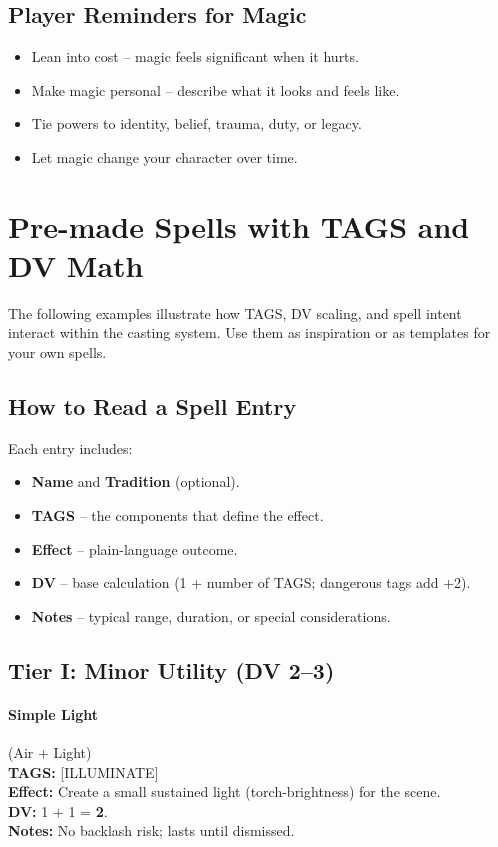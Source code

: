 \subsection{Player Reminders for Magic}
\begin{itemize}
    \item Lean into cost -- magic feels significant when it hurts.
    \item Make magic personal -- describe what it looks and feels like.
    \item Tie powers to identity, belief, trauma, duty, or legacy.
    \item Let magic change your character over time.
\end{itemize}

\clearpage

\section{Pre-made Spells with TAGS and DV Math}
\label{app:spell-examples}

The following examples illustrate how TAGS, DV scaling, and spell intent interact within the casting system. Use them as inspiration or as templates for your own spells.

\subsection{How to Read a Spell Entry}
Each entry includes:
\begin{itemize}
  \item \textbf{Name} and \textbf{Tradition} (optional).
  \item \textbf{TAGS} -- the components that define the effect.
  \item \textbf{Effect} -- plain-language outcome.
  \item \textbf{DV} -- base calculation (1 + number of TAGS; dangerous tags add +2).
  \item \textbf{Notes} -- typical range, duration, or special considerations.
\end{itemize}

\subsection{Tier I: Minor Utility (DV 2--3)}

\paragraph{Simple Light} (Air + Light) \\
\textbf{TAGS:} {[ILLUMINATE]} \\
\textbf{Effect:} Create a small sustained light (torch-brightness) for the scene. \\
\textbf{DV:} 1 + 1 = \textbf{2}. \\
\textbf{Notes:} No backlash risk; lasts until dismissed.

